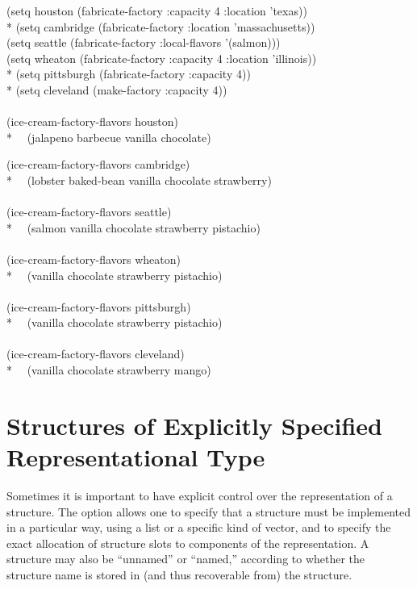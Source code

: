\begin{new}
\begin{lisp}
(setq houston (fabricate-factory :capacity 4 :location 'texas)) \\*
(setq cambridge (fabricate-factory :location 'massachusetts)) \\
(setq seattle (fabricate-factory :local-flavors '(salmon))) \\
(setq wheaton (fabricate-factory :capacity 4 :location 'illinois)) \\*
(setq pittsburgh (fabricate-factory :capacity 4)) \\*
(setq cleveland (make-factory :capacity 4)) \\
 \\
(ice-cream-factory-flavors houston) \\*
~\EV~(jalapeno barbecue vanilla chocolate)
\end{lisp}
\newpage%
\begin{lisp}
(ice-cream-factory-flavors cambridge) \\*
~\EV~(lobster baked-bean vanilla chocolate strawberry) \\
\\
(ice-cream-factory-flavors seattle) \\*
~\EV~(salmon vanilla chocolate strawberry pistachio) \\
\\
(ice-cream-factory-flavors wheaton) \\*
~\EV~(vanilla chocolate strawberry pistachio) \\
\\
(ice-cream-factory-flavors pittsburgh) \\*
~\EV~(vanilla chocolate strawberry pistachio) \\
\\
(ice-cream-factory-flavors cleveland) \\*
~\EV~(vanilla chocolate strawberry mango)
\end{lisp}
\end{new}


\section{Structures of Explicitly Specified Representational Type}
\label{EXPLICIT-TYPE-STRUCTURES}

Sometimes it is important to have explicit control
over the representation of a structure.  The 
option allows one to specify that a structure must be implemented
in a particular way, using a list or a specific kind of vector,
and to specify the exact allocation of structure slots to
components of the representation.
A structure may also be ``unnamed'' or ``named,'' according to whether
the structure name is stored in (and thus recoverable from) the structure.

